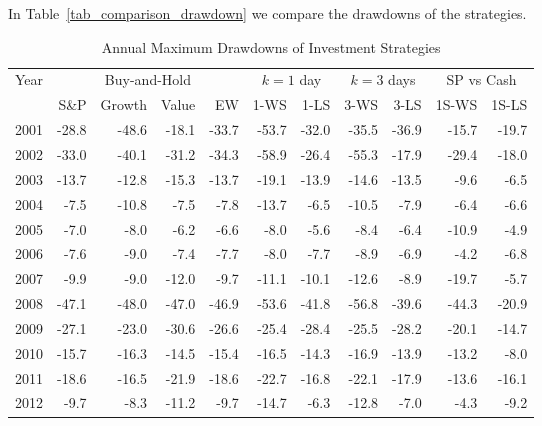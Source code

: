 \documentclass{article}
\begin{document}
In Table~\ref{tab_comparison_drawdown} we compare the drawdowns of the strategies.


\begin{table}[!ht]
    \centering
    \caption{Annual Maximum Drawdowns of Investment Strategies}
    \medskip
    \begin{tabular}{l | rrrr | rr | rr| rr}
    \hline
\multirow{2}{*}{Year} & \multicolumn{4}{c|}{Buy-and-Hold}   
& \multicolumn{2}{c|}{$k=1$  day}  & \multicolumn{2}{c}{$k=3$ days} & \multicolumn{2}{c}{SP vs Cash}  \\
  & S\&P & Growth & Value &EW & 1-WS & 1-LS & 3-WS & 3-LS & 1S-WS & 1S-LS \\ \hline
2001 & -28.8 & -48.6 & -18.1 & -33.7 & \cellcolor{red!25}-53.7 & -32.0 & -35.5 & -36.9 & \cellcolor{green!25}-15.7 & -19.7 \\
2002 & -33.0 & -40.1 & -31.2 & -34.3 & \cellcolor{red!25}-58.9 & -26.4 & -55.3 & \cellcolor{green!25}-17.9 & -29.4 & -18.0 \\
2003 & -13.7 & -12.8 & -15.3 & -13.7 & \cellcolor{red!25}-19.1 & -13.9 & -14.6 & -13.5 & -9.6 & \cellcolor{green!25}-6.5 \\
2004 & -7.5 & -10.8 & -7.5 & -7.8 & \cellcolor{red!25}-13.7 & -6.5 & -10.5 & -7.9 & \cellcolor{green!25}-6.4 & -6.6 \\
2005 & -7.0 & -8.0 & -6.2 & -6.6 & -8.0 & -5.6 & -8.4 & -6.4 & \cellcolor{red!25}-10.9 & \cellcolor{green!25}-4.9 \\
2006 & -7.6 & \cellcolor{red!25}-9.0 & -7.4 & -7.7 & -8.0 & -7.7 & -8.9 & -6.9 & \cellcolor{green!25}-4.2 & -6.8 \\
2007 & -9.9 & -9.0 & -12.0 & -9.7 & -11.1 & -10.1 & -12.6 & -8.9 & \cellcolor{red!25}-19.7 & \cellcolor{green!25}-5.7 \\
2008 & -47.1 & -48.0 & -47.0 & -46.9 & -53.6 & -41.8 & \cellcolor{red!25}-56.8 & -39.6 & -44.3 & \cellcolor{green!25}-20.9 \\
2009 & -27.1 & -23.0 & \cellcolor{red!25}-30.6 & -26.6 & -25.4 & -28.4 & -25.5 & -28.2 & -20.1 & \cellcolor{green!25}-14.7 \\
2010 & -15.7 & -16.3 & -14.5 & -15.4 & -16.5 & -14.3 & \cellcolor{red!25}-16.9 & -13.9 & -13.2 & \cellcolor{green!25}-8.0 \\
2011 & -18.6 & -16.5 & -21.9 & -18.6 & \cellcolor{red!25}-22.7 & -16.8 & -22.1 & -17.9 & \cellcolor{green!25}-13.6 & -16.1 \\
2012 & -9.7 & -8.3 & -11.2 & -9.7 & \cellcolor{red!25}-14.7 & -6.3 & -12.8 & -7.0 & \cellcolor{green!25}-4.3 & -9.2 \\

\end{tabular}
\end{table}
\end{document}
